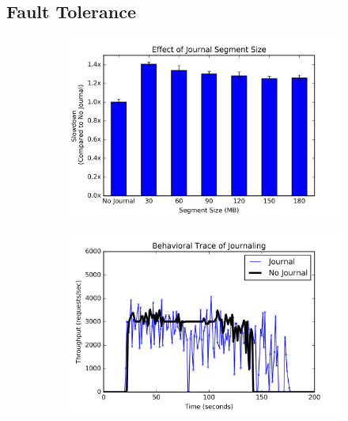 \subsection{Fault Tolerance}
\label{sec:fault-tolerance}

\begin{figure}[t]
  \centering
  \begin{subfigure}[b]{.3\linewidth}
      \centering
      \includegraphics[width=1.0\linewidth]{graphs/slowdown-journal.png}
      \caption{}
      \label{fig:phy-design}
  \end{subfigure}
  \begin{subfigure}[b]{.3\linewidth}
      \centering
      \includegraphics[width=1.0\linewidth]{graphs/behavior-journal.png}
      \caption{}
      \label{fig:batching}
  \end{subfigure}
  \begin{subfigure}[b]{.3\linewidth}

\end{subfigure}
\end{figure}
